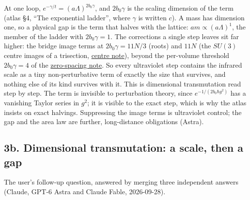 \documentclass[11pt,a4paper]{article}
\begin{document}
At one loop, \(e^{-\gamma/t}=(a\Lambda)^{2b_0\gamma}\), and
\(2b_0\gamma\) is the scaling dimension of the term (atlas §4, ``The
exponential ladder'', where \(\gamma\) is written \(c\)). A mass has
dimension one, so a physical gap is the term that halves with the
lattice: \(am\propto(a\Lambda)^1\), the member of the ladder with
\(2b_0\gamma=1\). The corrections a single step leaves sit far higher:
the bridge image terms at \(2b_0\gamma=11N/3\) (roots) and \(11N\) (the
\(SU(3)\) centre images of a trisection,
\href{sun-midpoint-centre.md}{centre note}), beyond the per-volume
threshold \(2b_0\gamma=4\) of the
\href{zero-spacing-any-action.md}{zero-spacing note}. So every
ultraviolet step contains the infrared scale as a tiny non-perturbative
term of exactly the size that survives, and nothing else of its kind
survives with it. This is dimensional transmutation read step by step.
The term is invisible to perturbation theory, since
\(e^{-1/(2b_0\hbar g^2)}\) has a vanishing Taylor series in \(g^2\); it
is visible to the exact step, which is why the atlas insists on exact
halvings. Suppressing the image terms is ultraviolet control; the gap
and the area law are further, long-distance obligations (Astra).

\hypertarget{b.-dimensional-transmutation-a-scale-then-a-gap}{%
\subsection{3b. Dimensional transmutation: a scale, then a
gap}\label{b.-dimensional-transmutation-a-scale-then-a-gap}}

The user's follow-up question, answered by merging three independent
answers (Claude, GPT-6 Astra and Claude Fable, 2026-09-28).
\end{document}
